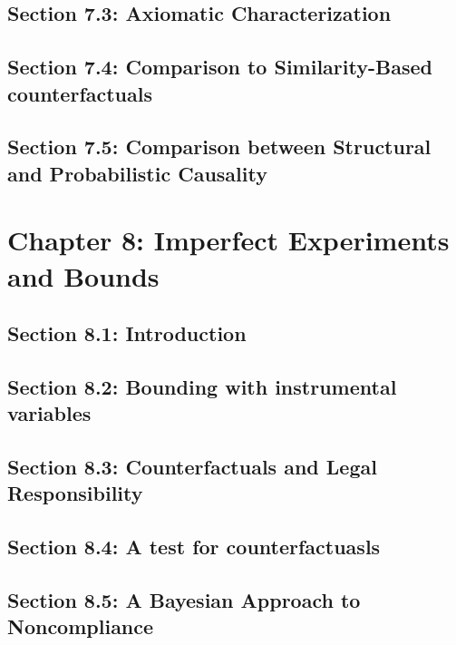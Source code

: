 \documentclass[oneside]{book}
\begin{document}


\section{Section 7.3: Axiomatic Characterization}



\section{Section 7.4: Comparison to Similarity-Based counterfactuals}



\section{Section 7.5: Comparison between Structural and Probabilistic Causality}



\chapter{Chapter 8: Imperfect Experiments and Bounds}

\section{Section 8.1: Introduction}



\section{Section 8.2: Bounding with instrumental variables}



\section{Section 8.3: Counterfactuals and Legal Responsibility}



\section{Section 8.4: A test for counterfactuasls}



\section{Section 8.5: A Bayesian Approach to Noncompliance}
\end{document}
